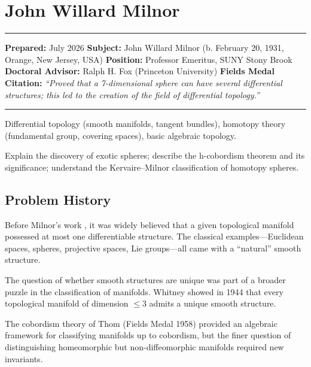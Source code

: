\chapter{John Willard Milnor}\label{ch1962johnwillardmilnor:john-willard-milnor-fields-medal-1962-a-comprehensive-report}

\begin{center}\rule{0.5\linewidth}{0.5pt}\end{center}

\textbf{Prepared:} July 2026
\textbf{Subject:} John Willard Milnor (b. February 20, 1931, Orange, New Jersey, USA)
\textbf{Position:} Professor Emeritus, SUNY Stony Brook
\textbf{Doctoral Advisor:} Ralph H. Fox (Princeton University)
\textbf{Fields Medal Citation:} \emph{``Proved that a 7-dimensional sphere can
have several differential structures; this led to the creation of the field of
differential topology.''}

\begin{center}\rule{0.5\linewidth}{0.5pt}\end{center}

\begin{prereqs} Differential topology (smooth manifolds, tangent bundles),
homotopy theory (fundamental group, covering spaces), basic algebraic topology.
\end{prereqs}

\begin{objectives} Explain the discovery of exotic spheres; describe the
h-cobordism theorem and its significance; understand the Kervaire--Milnor
classification of homotopy spheres. \end{objectives}

\section{Problem History}

Before Milnor's work \cite{milnor1956}, it was widely believed that a given topological manifold
possessed at most one differentiable structure. The classical examples---Euclidean
spaces, spheres, projective spaces, Lie groups---all came with a ``natural''
smooth structure.

The question of whether smooth structures are unique was part of a broader puzzle
in the classification of manifolds. Whitney showed in 1944 that every topological
manifold of dimension $\leq 3$ admits a unique smooth structure.

The cobordism theory of Thom (Fields Medal 1958) provided an algebraic framework
for classifying manifolds up to cobordism, but the finer question of distinguishing
homeomorphic but non-diffeomorphic manifolds required new invariants.

